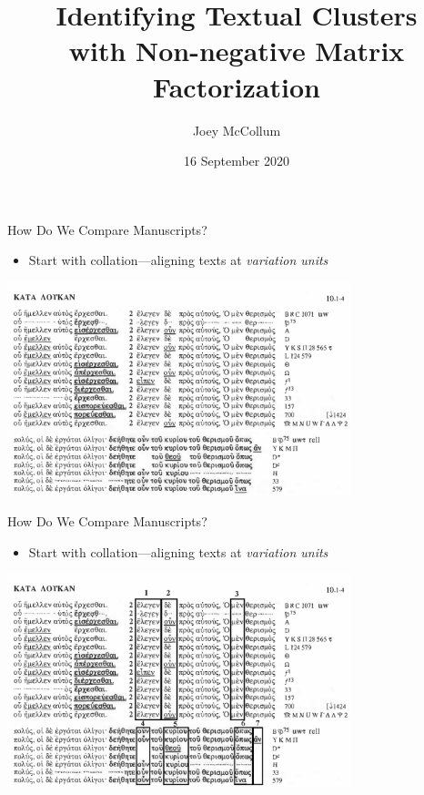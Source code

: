 \documentclass[10pt]{beamer}
\title{Identifying Textual Clusters\\with Non-negative Matrix Factorization}
\author{Joey McCollum\inst{*}}
\institute{\inst{*}Virginia Polytechnic Institute and State University}
\date{16 September 2020}
\begin{document}
	\begin{frame}
		\titlepage
	\end{frame}
	\begin{frame}{How Do We Compare Manuscripts?}
		\begin{itemize}
			\item Start with collation—aligning texts at \emph{variation units}
		\end{itemize}
		\begin{center}
			\includegraphics[width=0.75\textwidth]{../graphics/swanson_scan_luke_10_2.png}
		\end{center}
		\footnotesize\parencite[Source:][183]{Swanson.Luke}
	\end{frame}
	\begin{frame}{How Do We Compare Manuscripts?}
		\begin{itemize}
			\item Start with collation—aligning texts at \emph{variation units}
		\end{itemize}
		\begin{center}
			\includegraphics[width=0.75\textwidth]{../graphics/swanson_scan_luke_10_2_variation_units.png}
		\end{center}
		\phantom{\footnotesize\parencite[Source:][183]{Swanson.Luke}}
	\end{frame}
\end{document}
